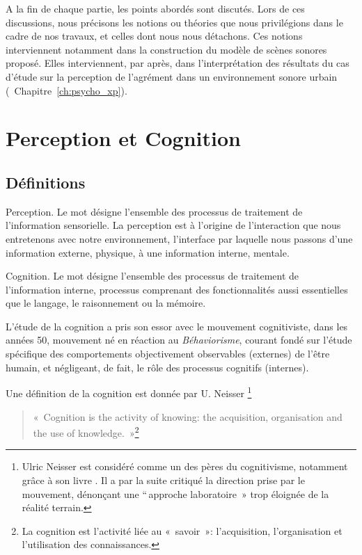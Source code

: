 A la fin de chaque partie, les points abordés sont discutés. Lors de ces discussions, nous précisons les notions ou théories que nous privilégions dans le cadre de nos travaux, et celles dont nous nous détachons. Ces notions interviennent notamment dans la construction du modèle de scènes sonores proposé. Elles interviennent, par après, dans l'interprétation des résultats du cas d'étude sur la perception de l'agrément dans un environnement sonore urbain (\cf~Chapitre~\ref{ch:psycho_xp}).

\section{Perception et Cognition}
\label{sec:ch3_perceptionCognition}

\subsection{Définitions}
\label{sec:ch3_perceptionCognitionDef}


Perception. Le mot désigne l'ensemble des processus de traitement de l'information sensorielle. La perception est à l'origine de l'interaction que nous entretenons avec notre environnement, l'interface par laquelle nous passons d'une information externe, physique, à une information interne, mentale.

Cognition. Le mot désigne l'ensemble des processus de traitement de l'information interne, processus comprenant des fonctionnalités aussi essentielles que le langage, le raisonnement ou la mémoire.

L'étude de la cognition a pris son essor avec le mouvement cognitiviste, dans les années 50, mouvement né en réaction au \emph{Béhaviorisme}, courant fondé sur l'étude spécifique des comportements objectivement observables (externes) de l'être humain, et négligeant, de fait, le rôle des processus cognitifs (internes).

Une définition de la cognition est donnée par U. Neisser \citep[p. 1]{neisser1976cognition}\footnote{Ulric Neisser est considéré comme un des pères du cognitivisme, notamment grâce à son livre \citep{neisser1967cognitive}. Il a par la suite critiqué la direction prise par le mouvement, dénonçant une ``\,approche laboratoire~» trop éloignée de la réalité terrain.}

\begin{quote}
\item «~Cognition is the activity of knowing: the acquisition, organisation and the use of knowledge.~»\footnote{La cognition est l'activité liée au «~savoir~»: l'acquisition, l'organisation et l'utilisation des connaissances.}
\end{quote}

